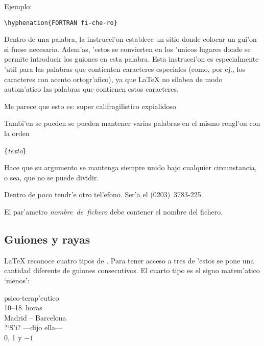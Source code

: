 Ejemplo:
\begin{code}
\verb|\hyphenation{FORTRAN fi-che-ro}|
\end{code}

Dentro de una palabra, la instrucci'on \ci{-} establece un sitio donde
colocar un gui'on si fuese necesario. Adem'as, 'estos se convierten en
los 'unicos lugares donde se permite introducir los guiones en esta
palabra. Esta instrucci'on es especialmente 'util para las palabras
que contienten caracteres especiales (como, por ej., los caracteres
con acento ortogr'afico), ya que \LaTeX{} no silabea de modo
autom'atico las palabras que contienen estos caracteres.

\begin{example}
Me parece que esto es: su\-per\-%
ca\-li\-fra\-gi\-lis\-ti\-co\-%
ex\-pia\-li\-do\-so
\end{example}

Tambi'en se pueden se pueden mantener varias palabras en el mismo
rengl'on con la orden
\begin{command}
\verb|{|\emph{texto}\verb|}|
\end{command}
\noindent Hace que su argumento se mantenga siempre unido bajo cualquier
circunstancia, o sea, que no se puede dividir.

\begin{example}
Dentro de poco tendr'e otro tel'efono.
Ser'a el \mbox{(0203) 3783-225}.

El par'ametro \mbox{\emph{nombre
de fichero}} debe contener el nombre
del fichero.
\end{example}


\subsection{Guiones y rayas}

\LaTeX{} reconoce cuatro tipos de . Para tener acceso a
tres de 'estos se pone una cantidad diferente de guiones consecutivos.
El cuarto tipo es el signo matem'atico `menos':
\index{-}%
\index{--}%
\index{---}%
%
%

\begin{example}
psico-terap'eutico \\
10--18~horas \\
Madrid -- Barcelona \\
?`S'i? ---dijo ella--- \\
0, 1 y $-1$
\end{example}

